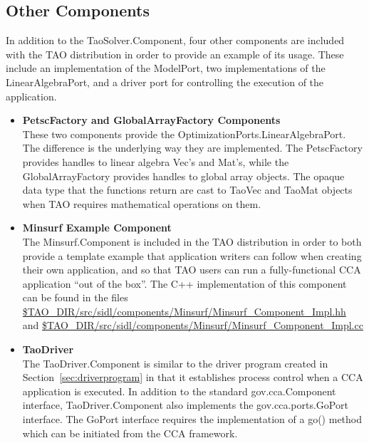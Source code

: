 \documentclass[doublespacing,12pt]{article}
\begin{document}
\subsection{Other Components}
In addition to the \textsf{TaoSolver.Component}, four other components are
included with the TAO distribution in order to provide an example of
its usage.  These include an implementation of the \textsf{ModelPort}, two
implementations of the \textsf{Lin\-ear\-Al\-ge\-bra\-Port}, and a driver port for
controlling the execution of the application.
\begin{itemize}
\item \textbf{PetscFactory and GlobalArrayFactory Components\\}
These two components provide the \textsf{Op\-ti\-mi\-za\-tion\-Ports.Lin\-ear\-Al\-ge\-bra\-Port}.
The difference is the underlying way they are implemented.  The
\textsf{PetscFact\-ory} provides handles to linear algebra 
Vec's and Mat's, while the
\textsf{GlobalArrayFact\-ory} provides handles to global array objects.  The
opaque data type that the functions return are cast to TaoVec and 
TaoMat objects when TAO requires mathematical operations on them.

\item \textbf{Minsurf Example Component}\\
The \textsf{Minsurf.Component} is included in the TAO distribution in order to
both provide a template example that application writers can follow when
creating their own application, and so that TAO users can run a
fully-functional CCA application ``out of the box''.  The C++
implementation of this component can be found in the files
\url{$TAO_DIR/src/sidl/components/Minsurf/Minsurf_Component_Impl.hh} and
\url{$TAO_DIR/src/sidl/components/Minsurf/Minsurf_Component_Impl.cc}



\item \textbf{TaoDriver}\\
The TaoDriver.Component is similar to the driver program created in
Section~\ref{sec:driverprogram} in that it establishes process control
when a CCA application is executed.  In addition to the standard
\textsf{gov.cca.Component} interface, \textsf{TaoDriver.Component}
also implements the
\textsf{gov.cca.ports.Go\-Port} interface.  The \textsf{GoPort}
interface requires the 
implementation of a
\textsf{go()} method which can be initiated from the CCA framework. 
\end{itemize}
\end{document}
